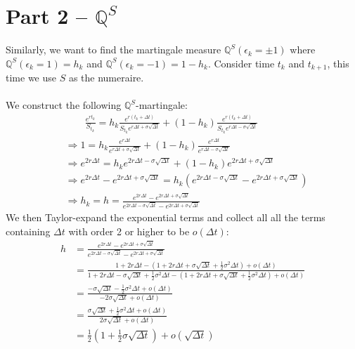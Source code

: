 \documentclass[12pt, letterpaper]{article}
\begin{document}
\newpage
\section*{Part 2 -- $\mathbb{Q}^S$}
Similarly, we want to find the martingale measure $\mathbb{Q}^S(\epsilon_k = \pm 1)$ where $\mathbb{Q}^S(\epsilon_k =1) = h_k$ and $\mathbb{Q}^S(\epsilon_k =-1) = 1-h_k$. Consider 
time $t_k$ and $t_{k+1}$, this time we use $S$ as the numeraire. \\ \\
We construct the following $\mathbb{Q}^S$-martingale:
\begin{align*}
  &\qquad \frac{e^{rt_k}}{S_{t_k}} = h_k\frac{e^{r(t_k+\Delta t)}}{S_{t_k}e^{r\Delta t + \sigma \sqrt{\Delta t}}} + (1-h_k)\frac{e^{r(t_k+\Delta t)}}{S_{t_k}e^{r\Delta t - \sigma \sqrt{\Delta t}}}\\
  &\Rightarrow  1 = h_k\frac{e^{r\Delta t}}{e^{r\Delta t + \sigma \sqrt{\Delta t}}} + (1-h_k) \frac{e^{r\Delta t}}{e^{r\Delta t - \sigma \sqrt{\Delta t}}} \\
  &\Rightarrow e^{2r\Delta t} = h_ke^{2r\Delta t - \sigma \sqrt{\Delta t}} + (1-h_k)e^{2r\Delta t + \sigma \sqrt{\Delta t}}\\
  &\Rightarrow e^{2r\Delta t} - e^{2r\Delta t + \sigma \sqrt{\Delta t}} = h_k(e^{2r\Delta t - \sigma \sqrt{\Delta t}} - e^{2r\Delta t + \sigma \sqrt{\Delta t}}) \\
  &\Rightarrow h_k = h = \frac{e^{2r\Delta t} - e^{2r\Delta t + \sigma \sqrt{\Delta t}}}{e^{2r\Delta t - \sigma \sqrt{\Delta t}} - e^{2r\Delta t + \sigma \sqrt{\Delta t}}} \tag*{As $h_k$ does not depend on $k$}
\end{align*}
We then Taylor-expand the exponential terms and collect all all the terms containing $\Delta t$ with order 2 or higher to be $o(\Delta t)$:
\begin{align*}
  h &= \frac{e^{2r\Delta t} - e^{2r\Delta t + \sigma \sqrt{\Delta t}}}{e^{2r\Delta t - \sigma \sqrt{\Delta t}} - e^{2r\Delta t + \sigma \sqrt{\Delta t}}} \\
    &= \frac{1+2r\Delta t - (1+2r\Delta t+\sigma \sqrt{\Delta t} + \frac{1}{2} \sigma^2\Delta t) + o(\Delta t)}
        {1+2r\Delta t - \sigma \sqrt{\Delta t} + \frac{1}{2} \sigma^2\Delta t - (1+2r\Delta t+\sigma \sqrt{\Delta t} + \frac{1}{2} \sigma^2\Delta t) + o(\Delta t)}\\
    &= \frac{-\sigma \sqrt{\Delta t} - \frac{1}{2} \sigma^2\Delta t+ o(\Delta t)}{-2\sigma \sqrt{\Delta t} +o(\Delta t)}\\
    &= \frac{\sigma \sqrt{\Delta t} + \frac{1}{2} \sigma^2\Delta t+ o(\Delta t)}{2\sigma \sqrt{\Delta t} +o(\Delta t)}\\
    &= \frac{1}{2}(1+\frac{1}{2}\sigma \sqrt{\Delta t}) + o(\sqrt{\Delta t})
\end{align*}
\end{document}
